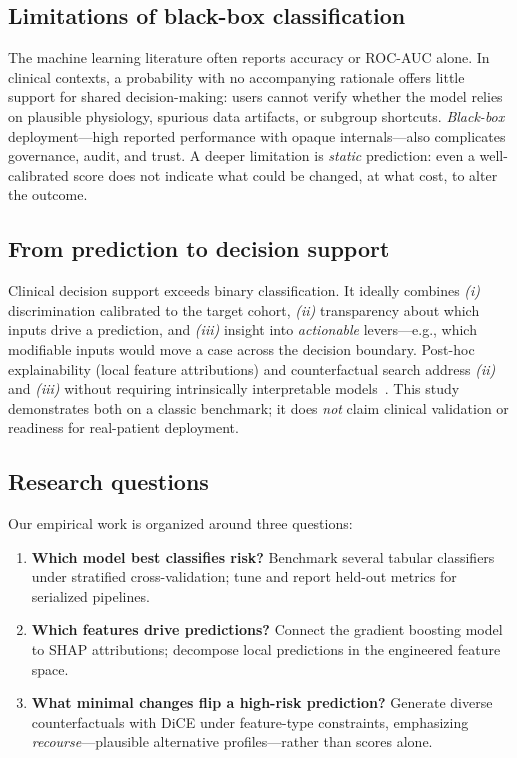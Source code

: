 \documentclass[11pt,a4paper]{article}
\begin{document}
\subsection{Limitations of black-box classification}

The machine learning literature often reports accuracy or ROC-AUC alone. In clinical contexts, a probability with no accompanying rationale offers little support for shared decision-making: users cannot verify whether the model relies on plausible physiology, spurious data artifacts, or subgroup shortcuts. \emph{Black-box} deployment—high reported performance with opaque internals—also complicates governance, audit, and trust. A deeper limitation is \emph{static} prediction: even a well-calibrated score does not indicate what could be changed, at what cost, to alter the outcome.

\subsection{From prediction to decision support}

Clinical decision support exceeds binary classification. It ideally combines \emph{(i)} discrimination calibrated to the target cohort, \emph{(ii)} transparency about which inputs drive a prediction, and \emph{(iii)} insight into \emph{actionable} levers—e.g., which modifiable inputs would move a case across the decision boundary. Post-hoc explainability (local feature attributions) and counterfactual search address \emph{(ii)} and \emph{(iii)} without requiring intrinsically interpretable models~\cite{lundberg,dice}. This study demonstrates both on a classic benchmark; it does \emph{not} claim clinical validation or readiness for real-patient deployment.

\subsection{Research questions}

Our empirical work is organized around three questions:
\begin{enumerate}[label=(\arabic*), leftmargin=*, itemsep=4pt]
  \item \textbf{Which model best classifies risk?} Benchmark several tabular classifiers under stratified cross-validation; tune and report held-out metrics for serialized pipelines.
  \item \textbf{Which features drive predictions?} Connect the gradient boosting model to SHAP attributions; decompose local predictions in the engineered feature space.
  \item \textbf{What minimal changes flip a high-risk prediction?} Generate diverse counterfactuals with DiCE under feature-type constraints, emphasizing \emph{recourse}—plausible alternative profiles—rather than scores alone.
\end{enumerate}
\end{document}
